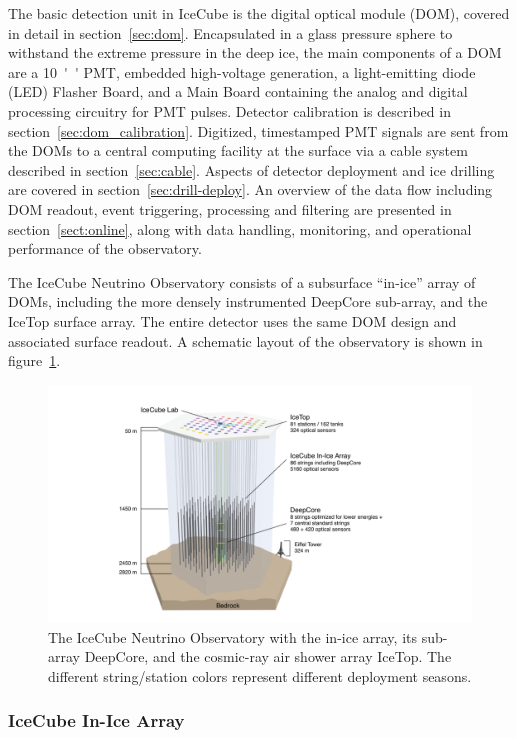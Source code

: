 The basic detection unit in IceCube is the
digital optical module (DOM), covered in detail in section~\ref{sec:dom}.
Encapsulated in a glass pressure sphere 
to withstand the extreme pressure in the deep ice, the main components of a DOM
are a \SI{10}{''} PMT, embedded high-voltage generation, a
light-emitting diode (LED) Flasher 
Board, and a Main Board containing the analog and digital processing circuitry
for PMT pulses.  Detector calibration
is described in section~\ref{sec:dom_calibration}.  Digitized, timestamped
PMT signals are sent from the DOMs to a
central computing facility at the surface via a cable system described in
section~\ref{sec:cable}.  Aspects of detector deployment and ice drilling are
covered in section~\ref{sec:drill-deploy}.  An overview of the data flow including
DOM readout, event triggering, processing and filtering are presented in
section~\ref{sect:online}, along with data handling, monitoring, and operational performance of
the observatory.

The IceCube Neutrino Observatory consists of a subsurface
``in-ice'' array of DOMs, including the more densely instrumented
DeepCore sub-array, and the IceTop surface array.  The entire detector
uses the same DOM design and associated surface readout. A schematic layout
of the observatory is shown in figure~\ref{fig:array}. 

\begin{figure}[!ht]
 \centering
 \includegraphics[width=\textwidth]{graphics/intro/ArrayWSeasonsLabels_crop.pdf}
 \caption{The IceCube Neutrino Observatory with the in-ice array, its sub-array DeepCore, and
   the cosmic-ray air shower array IceTop. The different string/station colors
   represent different deployment seasons.}
 \label{fig:array}
\end{figure}

\subsubsection{IceCube In-Ice Array}


